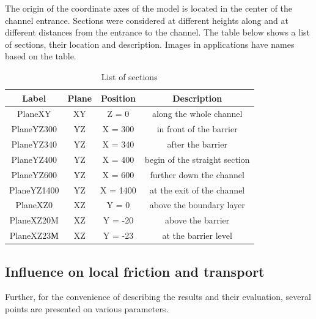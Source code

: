 	The origin of the coordinate axes of the model is located in the center of the channel entrance. Sections were considered at different heights along and at different distances from the entrance to the channel. The table below shows a list of sections, their location and description. Images in applications have names based on the table.
	\begin{table}[H]
		\begin{center}
			\begin{tabular}{|c|c|c|c|}
				\hline
				Label & Plane & Position & Description\\
				\hline
				PlaneXY & XY & Z = 0 & along the whole channel\\
				\hline
				PlaneYZ300 & YZ & X = 300 & in front of the barrier\\
				\hline
				PlaneYZ340 & YZ & X = 340 & after the barrier\\
				\hline
				PlaneYZ400 & YZ & X = 400 & begin of the straight section\\
				\hline
				PlaneYZ600 & YZ & X = 600 & further down the channel\\
				\hline
				PlaneYZ1400 & YZ & X = 1400 & at the exit of the channel\\
				\hline
				PlaneXZ0 & XZ & Y = 0 & above the boundary layer\\
				\hline
				PlaneXZ20M & XZ & Y = -20 & above the barrier\\
				\hline
				PlaneXZ23М & XZ & Y = -23 & at the barrier level\\
				\hline
			\end{tabular}
		\end{center}
		\label{tbl:sections}
		\caption{List of sections}
	\end{table}
	
\subsection{Influence on local friction and transport}
	Further, for the convenience of describing the results and their evaluation, several points are presented on various parameters.
